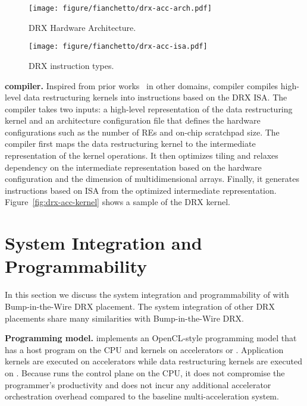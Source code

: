 \begin{figure}[ht!]
    \centering
    \texttt{[image: figure/fianchetto/drx-acc-arch.pdf]}
    \caption{DRX Hardware Architecture.
    }
    \label{fig:drx-acc-arch}
    \vspace{-2ex}
\end{figure}

\begin{figure}[ht!] 
    \centering
    \texttt{[image: figure/fianchetto/drx-acc-isa.pdf]}
    \caption{DRX instruction types.}
    \label{fig:drx-acc-isa}
\end{figure}

\noindent \textbf{\drx compiler.}
Inspired from prior works~\cite{tvm:osdi18, autotvm:2018} in other domains, \drx compiler compiles high-level data restructuring kernels into \drx instructions based on the DRX ISA.
%
%
The \drx compiler takes two inputs: a high-level representation of the data restructuring kernel and an architecture configuration file that defines the \drx hardware configurations such as the number of REs and on-chip scratchpad size.
The compiler first maps the data restructuring kernel to the intermediate representation of the kernel operations.
 It then optimizes tiling and relaxes dependency on the intermediate representation based on the hardware configuration and the dimension of multidimensional arrays. 
 Finally, it generates instructions based on \drx ISA from the optimized intermediate representation.
 Figure~\ref{fig:drx-acc-kernel} shows a sample of the DRX kernel.

 \section{System Integration and Programmability}
\label{sec:system}

In this section we discuss the system integration and programmability of \dmx with Bump-in-the-Wire DRX placement. The system integration of other DRX placements share many similarities with Bump-in-the-Wire DRX.

\noindent \textbf{Programming model.}
\dmx implements an OpenCL-style programming model that has a host program on the CPU and kernels on accelerators or \drx. 
%
Application kernels are executed on accelerators while data restructuring kernels are executed on \drx.
%
Because \dmx runs the control plane on the CPU, it does not compromise the programmer's productivity and does not incur any additional accelerator orchestration overhead compared to the baseline multi-acceleration system. %

